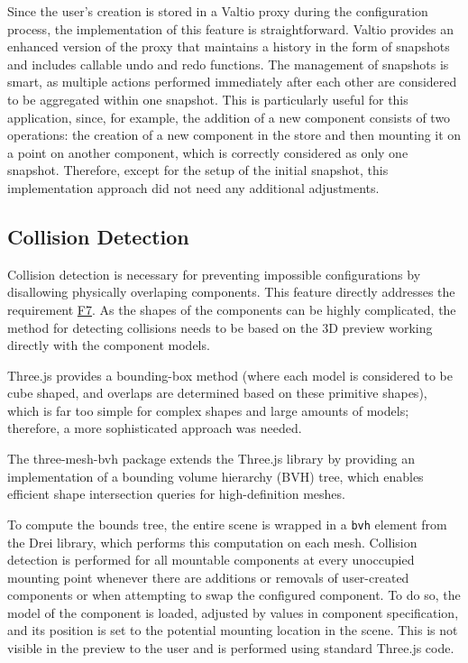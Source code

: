 Since the user's creation is stored in a Valtio proxy during the configuration process, the implementation of this feature is straightforward. Valtio provides an enhanced version of the proxy that maintains a history in the form of snapshots and includes callable undo and redo functions. The management of snapshots is smart, as multiple actions performed immediately after each other are considered to be aggregated within one snapshot. This is particularly useful for this application, since, for example, the addition of a new component consists of two operations: the creation of a new component in the store and then mounting it on a point on another component, which is correctly considered as only one snapshot. Therefore, except for the setup of the initial snapshot, this implementation approach did not need any additional adjustments.


\subsection{Collision Detection}

Collision detection is necessary for preventing impossible configurations by disallowing physically overlaping components. This feature directly addresses the requirement \hyperref[itm:F7]{F7}. As the shapes of the components can be highly complicated, the method for detecting collisions needs to be based on the 3D preview working directly with the component models.

Three.js provides a bounding-box method (where each model is considered to be cube shaped, and overlaps are determined based on these primitive shapes), which is far too simple for complex shapes and large amounts of models; therefore, a more sophisticated approach was needed. 

The three-mesh-bvh package extends the Three.js library by providing an implementation of a bounding volume hierarchy (BVH) tree, which enables efficient shape intersection queries for high-definition meshes. \cite{Johnson2023}

To compute the bounds tree, the entire scene is wrapped in a \texttt{bvh} element from the Drei library, which performs this computation on each mesh. Collision detection is performed for all mountable components at every unoccupied mounting point whenever there are additions or removals of user-created components or when attempting to swap the configured component. To do so, the model of the component is loaded, adjusted by values in component specification, and its position is set to the potential mounting location in the scene. This is not visible in the preview to the user and is performed using standard Three.js code. 

